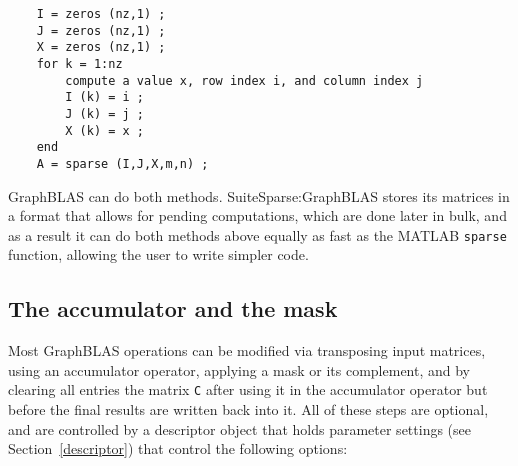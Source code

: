 \documentclass[12pt]{article}
\begin{document}
    \begin{mdframed}
    {\footnotesize
    \begin{verbatim}
    I = zeros (nz,1) ;
    J = zeros (nz,1) ;
    X = zeros (nz,1) ;
    for k = 1:nz
        compute a value x, row index i, and column index j
        I (k) = i ;
        J (k) = j ;
        X (k) = x ;
    end
    A = sparse (I,J,X,m,n) ;   \end{verbatim}} \end{mdframed}

GraphBLAS can do both methods.  SuiteSparse:GraphBLAS stores its matrices in a
format that allows for pending computations, which are done later in bulk, and
as a result it can do both methods above equally as fast as the MATLAB
\verb'sparse' function, allowing the user to write simpler code.

\subsection{The accumulator and the mask} %
\label{accummask}

Most GraphBLAS operations can be modified via transposing input matrices, using
an accumulator operator, applying a mask or its complement, and by clearing all
entries the matrix \verb'C' after using it in the accumulator operator but
before the final results are written back into it.  All of these steps are
optional, and are controlled by a descriptor object that holds parameter
settings (see Section~\ref{descriptor}) that control the following options:
\end{document}
